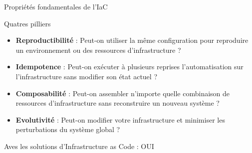 \documentclass[aspectratio=169,10pt]{beamer}
\begin{document}
\begin{frame}{Propriétés fondamentales de l'IaC}
  \begin{alertblock}{Quatres pilliers}
    \begin{itemize}
      \item \textbf{Reproductibilité} : Peut-on utiliser la même configuration pour reproduire un environnement ou des ressources d'infrastructure ? 
      \item \textbf{Idempotence} : Peut-on  exécuter à plusieurs reprises l'automatisation sur l'infrastructure sans modifier son état actuel ? 
      \item \textbf{Composabilité} : Peut-on assembler n’importe quelle combinaison de ressources d’infrastructure sans reconstruire un nouveau système ?
      \item \textbf{Evolutivité} : Peut-on modifier votre infrastructure et minimiser les perturbations du système global ?
    \end{itemize}
  \end{alertblock}

Aves les solutions d'Infrastructure as Code : OUI 
\end{frame}
\end{document}
